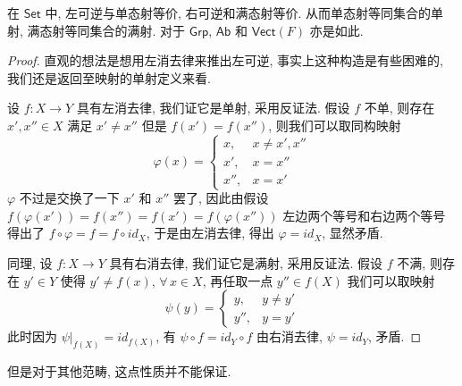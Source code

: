 \documentclass[UTF8]{book}
\begin{document}
\begin{proposition}
    在 $\mathsf{Set}$ 中, 左可逆与单态射等价, 右可逆和满态射等价. 
    从而单态射等同集合的单射, 满态射等同集合的满射. 
    对于 $\mathsf{Grp}$, $\mathsf{Ab}$ 和 $\mathsf{Vect}(F)$ 
    亦是如此. 
\end{proposition}

\begin{proof}
    直观的想法是想用左消去律来推出左可逆, 事实上这种构造是有些困难的, 
    我们还是返回至映射的单射定义来看. 

    设 $f: X\to Y$ 具有左消去律, 我们证它是单射, 采用反证法. 
    假设 $f$ 不单, 则存在 $x',x'' \in X$ 满足 $x' \neq x''$ 但是 
    $f(x')=f(x'')$, 则我们可以取同构映射 
    $$\varphi(x) = 
    \begin{cases}
        x, &x \neq x',x'' \\
        x', &x = x'' \\
        x'', &x = x'
    \end{cases}$$
    $\varphi$ 不过是交换了一下 $x'$ 和 $x''$ 罢了, 
    因此由假设 $f(\varphi(x'))=f(x'')=f(x')=f(\varphi(x''))$
    左边两个等号和右边两个等号得出了 $f\circ\varphi= f = f\circ id_X$, 
    于是由左消去律, 得出 $\varphi = id_X$, 显然矛盾. 

    同理, 设 $f: X\to Y$ 具有右消去律, 我们证它是满射, 采用反证法. 
    假设 $f$ 不满, 则存在 $y' \in Y$ 使得 
    $y' \neq f(x), \,\forall\,x \in X$, 
    再任取一点 $y'' \in f(X)$ 我们可以取映射 
    $$\psi(y) = 
    \begin{cases}
        y, &y \neq y' \\
        y'', &y = y' 
    \end{cases}$$
    此时因为 $\psi|_{f(X)}=id_{f(X)}$, 有 
    $\psi \circ f = id_Y \circ f$ 由右消去律, $\psi = id_Y$, 矛盾. 
\end{proof}

但是对于其他范畴, 这点性质并不能保证. 
\end{document}
